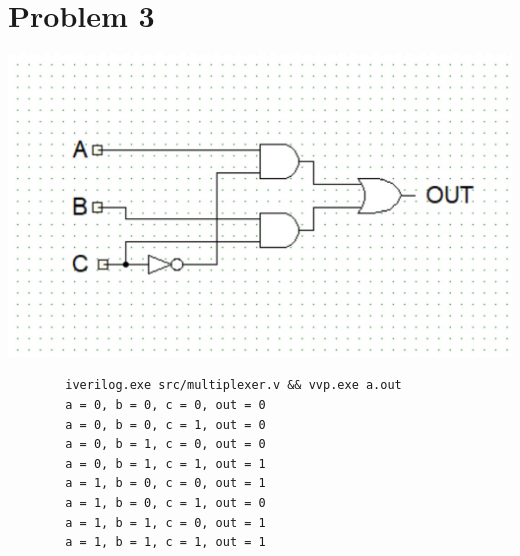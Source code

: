 \documentclass{article}
\newenvironment{problem}[1]{
  \nobreak\section*{Problem #1}
}{}
\begin{document}
\begin{problem}{3}
    \begin{center}
      \includegraphics[scale=0.8]{images/multiplexer.jpg}
    \end{center}

    \begin{center}
      \begin{lstlisting}
        iverilog.exe src/multiplexer.v && vvp.exe a.out
        a = 0, b = 0, c = 0, out = 0
        a = 0, b = 0, c = 1, out = 0
        a = 0, b = 1, c = 0, out = 0
        a = 0, b = 1, c = 1, out = 1
        a = 1, b = 0, c = 0, out = 1
        a = 1, b = 0, c = 1, out = 0
        a = 1, b = 1, c = 0, out = 1
        a = 1, b = 1, c = 1, out = 1
      \end{lstlisting}
    \end{center}
  \end{problem}
\end{document}
